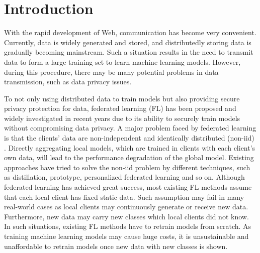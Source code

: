 \documentclass[sigconf,anonymous,review,screen]{acmart}
\begin{document}

\maketitle

\section{Introduction}
With the rapid development of Web, communication has become very convenient. Currently, data is widely generated and stored, and distributedly storing data is gradually becoming mainstream. Such a situation results in the need to transmit data to form a large training set to learn machine learning models. However, during this procedure, there may be many potential problems in data transmission, such as data privacy issues.

To not only using distributed data to train models but also providing secure privacy protection for data, federated learning (FL) \cite{mcmahan2017communication,li2020federated,tan2022fedproto,ma2022layer} has been proposed and widely investigated in recent years due to its ability to securely train models without compromising data privacy. A major problem faced by federated learning is that the clients' data are non-independent and identically distributed (non-iid) \cite{mcmahan2017communication,sattler2020clustered}. Directly aggregating local models, which are trained in clients with each client's own data, will lead to the performance degradation of the global model. Existing approaches \cite{zhang2022fine,tan2022fedproto,ma2022layer} have tried to  solve the non-iid problem by different techniques, such as distillation, prototype, personalized federated learning and so on. Although federated learning has achieved great success, most existing FL methods assume that each local client has fixed static data. Such assumption may fail in many real-world cases as local clients may continuously generate or receive new data. Furthermore, new data may carry new classes which local clients did not know. In such situations, existing FL methods have to retrain models from scratch. As training machine learning models may cause huge costs, it is  unsustainable and unaffordable to retrain models once new data with new classes is shown. 
\end{document}
